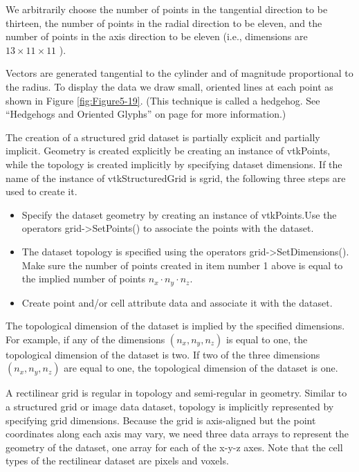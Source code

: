 \begin{description}[leftmargin=0cm,labelindent=0cm]
We arbitrarily choose the number of points in the tangential direction to be thirteen, the number of points in the radial direction to be eleven, and the number of points in the axis direction to be eleven (i.e., dimensions are $13 \times 11 \times 11$ ).

Vectors are generated tangential to the cylinder and of magnitude proportional to the radius. To display the data we draw small, oriented lines at each point as shown in Figure \ref{fig:Figure5-19}. (This technique is called a hedgehog. See ``Hedgehogs and Oriented Glyphs'' on page \pageref{subsec:hedgehogs_oriented_glyphs} for more information.)

The creation of a structured grid dataset is partially explicit and partially implicit. Geometry is created explicitly be creating an instance of vtkPoints, while the topology is created implicitly by specifying dataset dimensions. If the name of the instance of vtkStructuredGrid is sgrid, the following three steps are used to create it.

\begin{itemize}

	\item Specify the dataset geometry by creating an instance of vtkPoints.Use the operators grid->SetPoints() to associate the points with the dataset.

	\item The dataset topology is specified using the operators grid->SetDimensions(). Make sure the number of points created in item number 1 above is equal to the implied number of points $n_x⋅n_y⋅n_z$.

	\item Create point and/or cell attribute data and associate it with the dataset.

\end{itemize}

The topological dimension of the dataset is implied by the specified dimensions. For example, if any of the dimensions $(n_x, n_y, n_z)$ is equal to one, the topological dimension of the dataset is two. If two of the three dimensions $(n_x, n_y, n_z)$ are equal to one, the topological dimension of the dataset is one.

\item[Create a Rectilinear Grid Dataset.]

A rectilinear grid is regular in topology and semi-regular in geometry. Similar to a structured grid or image data dataset, topology is implicitly represented by specifying grid dimensions. Because the grid is axis-aligned but the point coordinates along each axis may vary, we need three data arrays to represent the geometry of the dataset, one array for each of the x-y-z axes. Note that the cell types of the rectilinear dataset are pixels and voxels.


\end{description}
